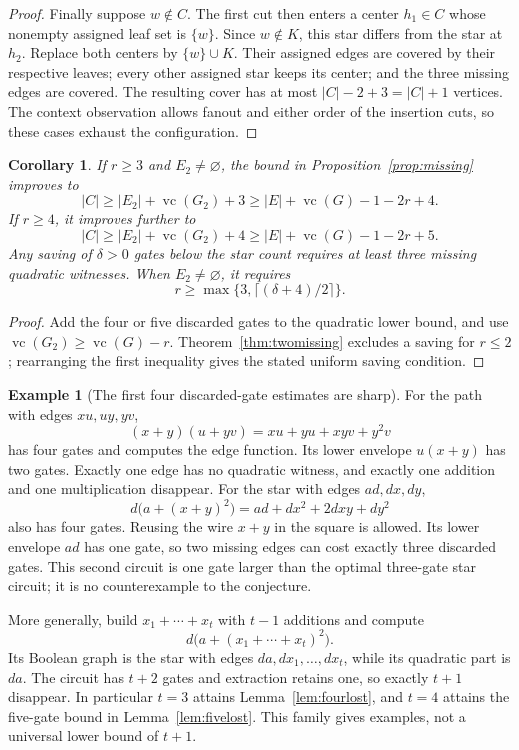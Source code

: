 \documentclass[11pt]{article}
\newcommand{\vc}{\operatorname{vc}}
\newtheorem{corollary}[theorem]{Corollary}
\theoremstyle{definition}
\newtheorem{example}[theorem]{Example}
\theoremstyle{remark}
\begin{document}
\begin{proof}
Finally suppose $w\notin C$. The first cut then enters a center $h_1\in C$ whose nonempty assigned leaf set is $\{w\}$. Since $w\notin K$, this star differs from the star at $h_2$. Replace both centers by $\{w\}\cup K$. Their assigned edges are covered by their respective leaves; every other assigned star keeps its center; and the three missing edges are covered. The resulting cover has at most $|C|-2+3=|C|+1$ vertices. The context observation allows fanout and either order of the insertion cuts, so these cases exhaust the configuration.
\end{proof}

\begin{corollary}\label{cor:fourlostbound}
If $r\ge3$ and $E_2\ne\varnothing$, the bound in Proposition~\ref{prop:missing} improves to
\[
 |C|\ge |E_2|+\vc(G_2)+3
 \ge |E|+\vc(G)-1-2r+4.
\]
If $r\ge4$, it improves further to
\[
 |C|\ge |E_2|+\vc(G_2)+4
 \ge |E|+\vc(G)-1-2r+5.
\]
Any saving of $\delta>0$ gates below the star count requires at least three missing quadratic witnesses. When $E_2\ne\varnothing$, it requires
\[
 r\ge\max\{3,\lceil(\delta+4)/2\rceil\}.
\]
\end{corollary}
\begin{proof}
Add the four or five discarded gates to the quadratic lower bound, and use $\vc(G_2)\ge\vc(G)-r$. Theorem~\ref{thm:twomissing} excludes a saving for $r\le2$; rearranging the first inequality gives the stated uniform saving condition.
\end{proof}

\begin{example}[The first four discarded-gate estimates are sharp]
For the path with edges $xu,uy,yv$,
\[
 (x+y)(u+yv)=xu+yu+xyv+y^2v
\]
has four gates and computes the edge function. Its lower envelope $u(x+y)$ has two gates. Exactly one edge has no quadratic witness, and exactly one addition and one multiplication disappear. For the star with edges $ad,dx,dy$,
\[
 d\bigl(a+(x+y)^2\bigr)=ad+dx^2+2dxy+dy^2
\]
also has four gates. Reusing the wire $x+y$ in the square is allowed. Its lower envelope $ad$ has one gate, so two missing edges can cost exactly three discarded gates. This second circuit is one gate larger than the optimal three-gate star circuit; it is no counterexample to the conjecture.

More generally, build $x_1+\cdots+x_t$ with $t-1$ additions and compute
\[
 d\bigl(a+(x_1+\cdots+x_t)^2\bigr).
\]
Its Boolean graph is the star with edges $da,dx_1,\ldots,dx_t$, while its quadratic part is $da$. The circuit has $t+2$ gates and extraction retains one, so exactly $t+1$ disappear. In particular $t=3$ attains Lemma~\ref{lem:fourlost}, and $t=4$ attains the five-gate bound in Lemma~\ref{lem:fivelost}. This family gives examples, not a universal lower bound of $t+1$.
\end{example}
\end{document}
